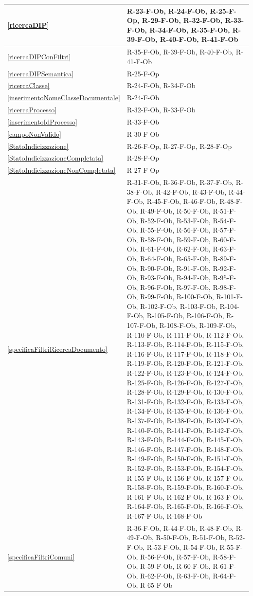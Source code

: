 \begin{longtable}{|p{4cm}|p{10cm}|}
\hline
\ref{ricercaDIP} & R-23-F-Ob, R-24-F-Ob, R-25-F-Op, R-29-F-Ob, R-32-F-Ob, R-33-F-Ob, R-34-F-Ob, R-35-F-Ob, R-39-F-Ob, R-40-F-Ob, R-41-F-Ob \\
\hline
\ref{ricercaDIPConFiltri} & R-35-F-Ob, R-39-F-Ob, R-40-F-Ob, R-41-F-Ob \\
\hline
\ref{ricercaDIPSemantica} & R-25-F-Op \\
\hline
\ref{ricercaClasse} & R-24-F-Ob, R-34-F-Ob \\
\hline
\ref{inserimentoNomeClasseDocumentale} & R-24-F-Ob \\
\hline
\ref{ricercaProcesso} & R-32-F-Ob, R-33-F-Ob \\
\hline
\ref{inserimentoIdProcesso} & R-33-F-Ob \\
\hline
\ref{campoNonValido} & R-30-F-Ob \\
\hline
\ref{StatoIndicizzazione} & R-26-F-Op, R-27-F-Op, R-28-F-Op \\
\hline
\ref{StatoIndicizzazioneCompletata} & R-28-F-Op \\
\hline
\ref{StatoIndicizzazioneNonCompletata} & R-27-F-Op \\
\hline
\ref{specificaFiltriRicercaDocumento} & R-31-F-Ob, R-36-F-Ob, R-37-F-Ob, R-38-F-Ob, R-42-F-Ob, R-43-F-Ob, R-44-F-Ob, R-45-F-Ob, R-46-F-Ob, R-48-F-Ob, R-49-F-Ob, R-50-F-Ob, R-51-F-Ob, R-52-F-Ob, R-53-F-Ob, R-54-F-Ob, R-55-F-Ob, R-56-F-Ob, R-57-F-Ob, R-58-F-Ob, R-59-F-Ob, R-60-F-Ob, R-61-F-Ob, R-62-F-Ob, R-63-F-Ob, R-64-F-Ob, R-65-F-Ob, R-89-F-Ob, R-90-F-Ob, R-91-F-Ob, R-92-F-Ob, R-93-F-Ob, R-94-F-Ob, R-95-F-Ob, R-96-F-Ob, R-97-F-Ob, R-98-F-Ob, R-99-F-Ob, R-100-F-Ob, R-101-F-Ob, R-102-F-Ob, R-103-F-Ob, R-104-F-Ob, R-105-F-Ob, R-106-F-Ob, R-107-F-Ob, R-108-F-Ob, R-109-F-Ob, R-110-F-Ob, R-111-F-Ob, R-112-F-Ob, R-113-F-Ob, R-114-F-Ob, R-115-F-Ob, R-116-F-Ob, R-117-F-Ob, R-118-F-Ob, R-119-F-Ob, R-120-F-Ob, R-121-F-Ob, R-122-F-Ob, R-123-F-Ob, R-124-F-Ob, R-125-F-Ob, R-126-F-Ob, R-127-F-Ob, R-128-F-Ob, R-129-F-Ob, R-130-F-Ob, R-131-F-Ob, R-132-F-Ob, R-133-F-Ob, R-134-F-Ob, R-135-F-Ob, R-136-F-Ob, R-137-F-Ob, R-138-F-Ob, R-139-F-Ob, R-140-F-Ob, R-141-F-Ob, R-142-F-Ob, R-143-F-Ob, R-144-F-Ob, R-145-F-Ob, R-146-F-Ob, R-147-F-Ob, R-148-F-Ob, R-149-F-Ob, R-150-F-Ob, R-151-F-Ob, R-152-F-Ob, R-153-F-Ob, R-154-F-Ob, R-155-F-Ob, R-156-F-Ob, R-157-F-Ob, R-158-F-Ob, R-159-F-Ob, R-160-F-Ob, R-161-F-Ob, R-162-F-Ob, R-163-F-Ob, R-164-F-Ob, R-165-F-Ob, R-166-F-Ob, R-167-F-Ob, R-168-F-Ob \\
\hline
\ref{specificaFiltriComuni} & R-36-F-Ob, R-44-F-Ob, R-48-F-Ob, R-49-F-Ob, R-50-F-Ob, R-51-F-Ob, R-52-F-Ob, R-53-F-Ob, R-54-F-Ob, R-55-F-Ob, R-56-F-Ob, R-57-F-Ob, R-58-F-Ob, R-59-F-Ob, R-60-F-Ob, R-61-F-Ob, R-62-F-Ob, R-63-F-Ob, R-64-F-Ob, R-65-F-Ob \\

\end{longtable}
